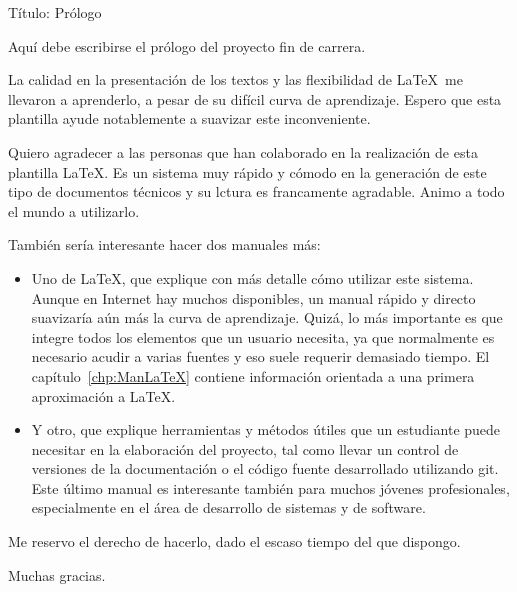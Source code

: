  Título:	Prólogo



Aquí debe escribirse el prólogo del proyecto fin de carrera.

\medskip

La calidad en la presentación de los textos y las flexibilidad de \LaTeX\ me llevaron a aprenderlo, a pesar de su difícil curva de aprendizaje.
Espero que esta plantilla ayude notablemente a suavizar este inconveniente.

Quiero agradecer a las personas que han colaborado en la realización de esta plantilla \LaTeX. Es un sistema muy rápido y cómodo en la generación de este tipo de documentos técnicos y su lctura es francamente agradable. Animo a todo el mundo a utilizarlo.

También sería interesante hacer dos manuales más:

\begin{itemize}

	\item Uno de \LaTeX, que explique con más detalle cómo utilizar este sistema. Aunque en Internet hay muchos disponibles, un manual rápido y directo suavizaría aún más la curva de aprendizaje. Quizá, lo más importante es que integre todos los elementos que un usuario necesita, ya que normalmente es necesario acudir a varias fuentes y eso suele requerir demasiado tiempo.	El capítulo~\ref{chp:ManLaTeX} contiene información orientada a una primera aproximación a \LaTeX.

	\item Y otro, que explique herramientas y métodos útiles que un estudiante puede necesitar en la elaboración del proyecto, tal como llevar un control de versiones de la documentación o el código fuente desarrollado utilizando git. Este último manual es interesante también para muchos jóvenes profesionales, especialmente en el área de desarrollo de sistemas y de software.

\end{itemize}

	Me reservo el derecho de hacerlo, dado el escaso tiempo del que dispongo.
	\bigskip

	Muchas gracias.

\chapterend
